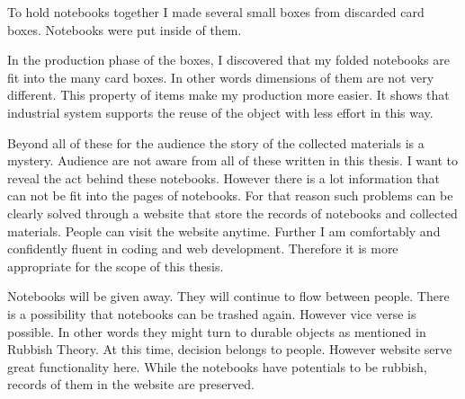 To hold notebooks together I made several small boxes from discarded card boxes. Notebooks were put inside of them.

In the production phase of the boxes, I discovered that my folded notebooks are fit into the many card boxes. In other words dimensions of them are not very different. This property of items make my production more easier. It shows that industrial system supports the reuse of the object with less effort in this way.







Beyond all of these for the audience the story of the collected materials is a mystery. Audience are not aware from all of these written in this thesis. I want to reveal the act behind these notebooks. However there is a lot information that can not be fit into the pages of notebooks. For that reason such problems can be clearly solved through a website that store the records of notebooks and collected materials. People can visit the website anytime. Further I am comfortably and confidently fluent in coding and web development. Therefore it is more appropriate for the scope of this thesis.

Notebooks will be given away. They will continue to flow between people. There is a possibility that notebooks can be trashed again. However vice verse is possible. In other words they might turn to durable objects as mentioned in Rubbish Theory. At this time, decision belongs to people. However website serve great functionality here. While the notebooks have potentials to be rubbish, records of them in the website are preserved.





